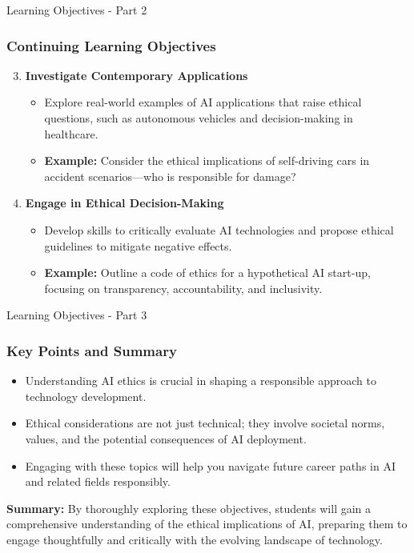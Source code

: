 \documentclass[aspectratio=169]{beamer}
\begin{document}
\begin{frame}[fragile]{Learning Objectives - Part 2}
    \frametitle{Continuing Learning Objectives}
    \begin{enumerate}\setcounter{enumi}{2}
        \item \textbf{Investigate Contemporary Applications}
        \begin{itemize}
            \item Explore real-world examples of AI applications that raise ethical questions, such as autonomous vehicles and decision-making in healthcare.
            \item \textbf{Example:} Consider the ethical implications of self-driving cars in accident scenarios—who is responsible for damage?
        \end{itemize}

        \item \textbf{Engage in Ethical Decision-Making}
        \begin{itemize}
            \item Develop skills to critically evaluate AI technologies and propose ethical guidelines to mitigate negative effects.
            \item \textbf{Example:} Outline a code of ethics for a hypothetical AI start-up, focusing on transparency, accountability, and inclusivity.
        \end{itemize}
    \end{enumerate}
\end{frame}

\begin{frame}[fragile]{Learning Objectives - Part 3}
    \frametitle{Key Points and Summary}
    \begin{itemize}
        \item Understanding AI ethics is crucial in shaping a responsible approach to technology development.
        \item Ethical considerations are not just technical; they involve societal norms, values, and the potential consequences of AI deployment.
        \item Engaging with these topics will help you navigate future career paths in AI and related fields responsibly.
    \end{itemize}
    
    \textbf{Summary:} By thoroughly exploring these objectives, students will gain a comprehensive understanding of the ethical implications of AI, preparing them to engage thoughtfully and critically with the evolving landscape of technology.
\end{frame}
\end{document}
